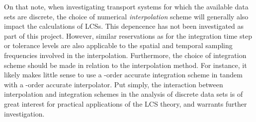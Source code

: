 On that note, when investigating transport systems for which the available
data sets are discrete, the choice of numerical \emph{interpolation} scheme
will generally also impact the calculations of LCSs. This depencence has not
been investigated as part of this project. However, similar reservations
as for the integration time step or tolerance levels are also applicable to
the spatial and temporal sampling frequencies involved in the interpolation.
Furthermore, the choice of integration scheme should be made in relation
to the interpolation method. For instance, it likely makes little sense to use a
-order accurate integration scheme in tandem with a -order
accurate interpolator. Put simply, the interaction between interpolation
and integration schemes in the analysis of discrete data sets is of great
interest for practical applications of the LCS theory, and warrants
further investigation.
